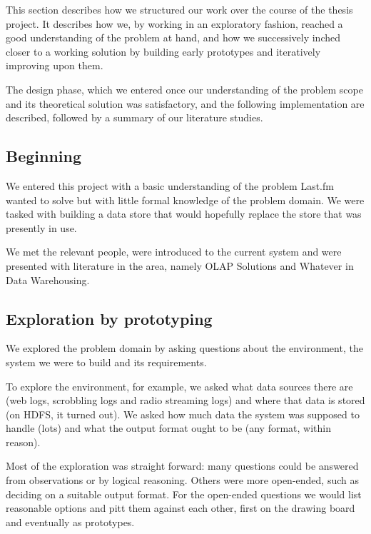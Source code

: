 This section describes how we structured our work over the course of the thesis
project. It describes how we, by working in an exploratory fashion, reached a
good understanding of the problem at hand, and how we successively inched closer
to a working solution by building early prototypes and iteratively improving
upon them.

The design phase, which we entered once our understanding of the problem scope
and its theoretical solution was satisfactory, and the following implementation
are described, followed by a summary of our literature studies.

\subsection*{Beginning}


We entered this project with a basic understanding of the problem Last.fm wanted
to solve but with little formal knowledge of the problem domain. We were tasked
with building a data store that would hopefully replace the store that was
presently in use.

We met the relevant people, were introduced to the current system and were
presented with literature in the area, namely OLAP Solutions and Whatever in
Data Warehousing.

\subsection*{Exploration by prototyping}

We explored the problem domain by asking questions about the environment, the
system we were to build and its requirements.

To explore the environment, for example, we asked what data sources there are
(web logs, scrobbling logs and radio streaming logs) and where that data is
stored (on HDFS, it turned out). We asked how much data the system was supposed
to handle (lots) and what the output format ought to be (any format, within
reason).

Most of the exploration was straight forward: many questions could be answered
from observations or by logical reasoning. Others were more open-ended, such as
deciding on a suitable output format. For the open-ended questions we would list
reasonable options and pitt them against each other, first on the drawing board
and eventually as prototypes.

